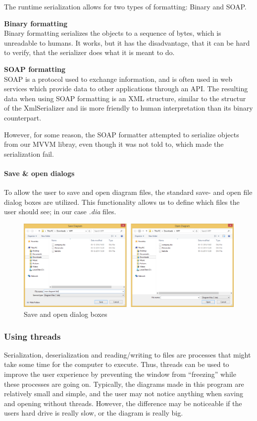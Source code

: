 The runtime serialization allows for two types of formatting: Binary and SOAP.

\textbf{Binary formatting}\\
Binary formatting serializes the objects to a
sequence of bytes, which is unreadable to humans. It works, but it has the
disadvantage, that it can be hard to verify, that the serializer does what it is
meant to do.

\textbf{SOAP formatting}\\
SOAP is a protocol used to exchange information, and
is often used in web services which provide data to other applications through
an API. The resulting data when using SOAP formatting is an XML structure,
similar to the structur of the XmlSerializer and iis more friendly to human
interpretation than its binary counterpart.

However, for some reason, the SOAP formatter attempted to serialize objects from
our MVVM libray, even though it was not told to, which made the serialization
fail.

\paragraph{Save \& open dialogs}
To allow the user to save and open diagram files, the standard save- and open 
file dialog boxes are utilized. This functionality allows us to define which 
files the user should see; in our case \emph{.dia} files.

\begin{figure}[H]
	\centering
	\includegraphics[width=\linewidth]{img/save_open.png}
	\caption{Save and open dialog boxes \label{saveopen}}
\end{figure}

\subsubsection{Using threads}
Serialization, deserialization and reading/writing
to files are processes that might take some time for the computer to execute.
Thus, threads can be used to improve the user experience by preventing the
window from “freezing” while these processes are going on. Typically, the
diagrams made in this program are relatively small and simple, and the user may
not notice anything when saving and opening without threads. However, the
difference may be noticeable if the users hard drive is really slow, or the
diagram is really big.

